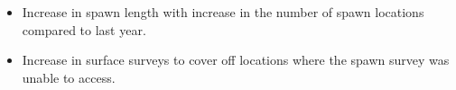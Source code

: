 \begin{itemize}
\item Increase in spawn length with increase in the number of spawn locations compared to last year.
\item Increase in surface surveys to cover off locations where the spawn survey was unable to access.
\end{itemize}